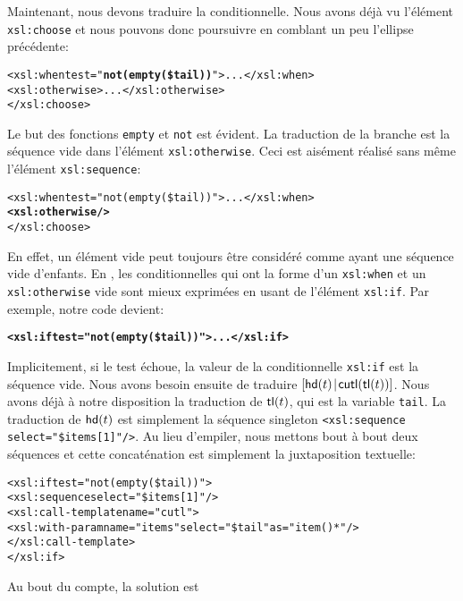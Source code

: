 Maintenant, nous devons traduire la conditionnelle. Nous avons déjà vu
l'élément \texttt{xsl:choose} et nous pouvons donc poursuivre en
comblant un peu l'ellipse précédente:
\begin{alltt}
      <xsl:when test="\textbf{not(empty(\$tail))}"> ... </xsl:when>
      <xsl:otherwise> ... </xsl:otherwise>
    </xsl:choose>
\end{alltt}
Le but des fonctions \XPath \texttt{empty} et \texttt{not} est
évident. La traduction de la branche  est la séquence vide
dans l'élément \texttt{xsl:otherwise}. Ceci est aisément réalisé sans
même l'élément \texttt{xsl:sequence}:
\begin{alltt}
      <xsl:when test="not(empty(\$tail))"> ... </xsl:when>
      \textbf{<xsl:otherwise/>}
    </xsl:choose>
\end{alltt}
En effet, un élément vide peut toujours être considéré comme ayant une
séquence vide d'enfants. En \XSLT, les conditionnelles qui ont la
forme d'un \texttt{xsl:when} et un \texttt{xsl:otherwise} vide sont
mieux exprimées en usant de l'élément \texttt{xsl:if}. Par exemple,
notre code devient:
\begin{alltt}
\small    \textbf{<xsl:if test="not(empty(\$tail))"> ... </xsl:if>}
\end{alltt}
Implicitement, si le test échoue, la valeur de la conditionnelle
\texttt{xsl:if} est la séquence vide. Nous avons besoin ensuite de
traduire
\([{\textsf{hd}(t)}\!\mid\!{\textsf{cutl}(\textsf{tl}(t))}]\).
Nous avons déjà à notre disposition la traduction de \(\textsf{tl}(t)\),
qui est la variable \XSLT \texttt{tail}. La traduction de
\(\textsf{hd}(t)\) est simplement la séquence singleton
\texttt{<xsl:sequence select="\$items[1]"/>}. Au lieu d'empiler, nous
mettons bout à bout deux séquences et cette concaténation est
simplement la juxtaposition textuelle:
\begin{alltt}
\small    <xsl:if test="not(empty(\$tail))">
      <xsl:sequence select="\$items[1]"/>
      <xsl:call-template name="cutl">
        \!<xsl:with-param name="items" select="\$tail" \!as="item()*"/>
      </xsl:call-template>
    </xsl:if>
\end{alltt}
Au bout du compte, la solution est

